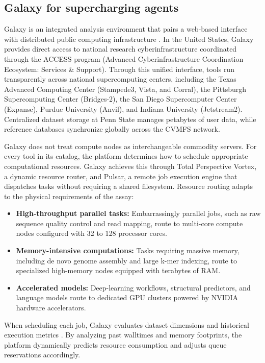 \documentclass[11pt,letterpaper]{article}
\begin{document}
\subsection{Galaxy for supercharging agents}
Galaxy is an integrated analysis environment that pairs a web-based interface with distributed public computing infrastructure \cite{galaxy2024}. In the United States, Galaxy provides direct access to national research cyberinfrastructure coordinated through the ACCESS program (Advanced Cyberinfrastructure Coordination Ecosystem: Services \& Support). Through this unified interface, tools run transparently across national supercomputing centers, including the Texas Advanced Computing Center (Stampede3, Vista, and Corral), the Pittsburgh Supercomputing Center (Bridges-2), the San Diego Supercomputer Center (Expanse), Purdue University (Anvil), and Indiana University (Jetstream2). Centralized dataset storage at Penn State manages petabytes of user data, while reference databases synchronize globally across the CVMFS network.

Galaxy does not treat compute nodes as interchangeable commodity servers. For every tool in its catalog, the platform determines how to schedule appropriate computational resources. Galaxy achieves this through Total Perspective Vortex, a dynamic resource router, and Pulsar, a remote job execution engine that dispatches tasks without requiring a shared filesystem. Resource routing adapts to the physical requirements of the assay:
\begin{itemize}
    \item \textbf{High-throughput parallel tasks:} Embarrassingly parallel jobs, such as raw sequence quality control and read mapping, route to multi-core compute nodes configured with 32 to 128 processor cores.
    \item \textbf{Memory-intensive computations:} Tasks requiring massive memory, including de novo genome assembly and large k-mer indexing, route to specialized high-memory nodes equipped with terabytes of RAM.
    \item \textbf{Accelerated models:} Deep-learning workflows, structural predictors, and language models route to dedicated GPU clusters powered by NVIDIA hardware accelerators.
\end{itemize}
When scheduling each job, Galaxy evaluates dataset dimensions and historical execution metrics \cite{tyryshkina2019}. By analyzing past walltimes and memory footprints, the platform dynamically predicts resource consumption and adjusts queue reservations accordingly.
\end{document}
